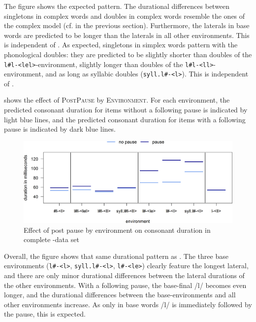  The figure shows the expected pattern. The durational differences between singletons in complex words and doubles in complex words resemble the ones of the complex model (cf.  in the previous section).\largerpage
 Furthermore, the laterals in base words are predicted to be longer than the laterals in all other environments. This is independent of . 
 As expected, singletons in simplex words pattern with the phonological doubles: they are predicted to be slightly shorter than doubles of the \texttt{l\#l-<lel>}-environment, slightly longer than doubles of the \texttt{l\#l-<ll>}-environment, and as long as syllabic doubles (\texttt{syll.l\#-<l>}). This is independent of .
 
 
 
  shows the effect of \textsc{PostPause} by \textsc{Environment}. For each environment, the predicted consonant duration for items without a following pause is indicated by light blue lines, and the predicted consonant duration for  items with a following pause is indicated by dark blue lines.

 \begin{figure}
 	\includegraphics [scale=0.48] {images/Experiment/LyModelCompleteInterEnvPauseLines}
 	\caption{Effect of  post pause by environment on consonant duration in complete -data set}
 	\label{fig:Env pause lyComplete experiment}
 \end{figure}
 

 Overall, the figure shows that same durational pattern as . The three base environments (\texttt{l\#-<l>}, \texttt{syll.l\#-<l>}, \texttt{l\#-<le>}) clearly feature the longest lateral, and there are only minor durational differences between the lateral durations of the other environments. 
 With a following pause, the base-final /l/ becomes even longer, and the durational differences between the base-environ\-ments and all other environments increase. As only in base words /l/ is immediately followed by the pause, this is expected. 



